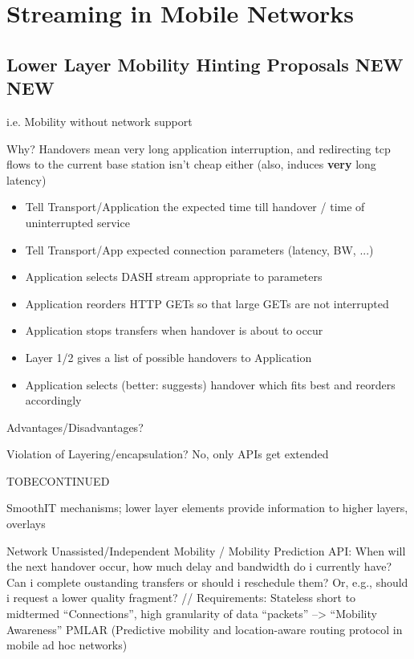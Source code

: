 \chapter{Streaming in Mobile Networks}




\section{Lower Layer Mobility Hinting Proposals NEW NEW}

i.e. Mobility without network support

Why? Handovers mean very long application interruption, and redirecting tcp flows to the current base station isn't cheap either (also, induces \textbf{very} long latency)

\begin{itemize}
\item Tell Transport/Application the expected time till handover / time of uninterrupted service
\item Tell Transport/App expected connection parameters (latency, BW, ...)
\item Application selects DASH stream appropriate to parameters
\item Application reorders HTTP GETs so that large GETs are not interrupted
\item Application stops transfers when handover is about to occur
\item Layer 1/2 gives a list of possible handovers to Application
\item Application selects (better: suggests) handover which fits best and reorders accordingly
\end{itemize}

Advantages/Disadvantages?

Violation of Layering/encapsulation? No, only APIs get extended 

TOBECONTINUED

SmoothIT mechanisms; lower layer elements provide information to higher layers, overlays  \cite{oechsner2009pushing}


Network Unassisted/Independent Mobility / Mobility Prediction API: When will the next handover occur, how much delay and bandwidth do i currently have? Can i complete oustanding transfers or should i reschedule them? Or, e.g., should i request a lower quality fragment? // Requirements: Stateless short to midtermed ``Connections'', high granularity of data ``packets''
--> ``Mobility Awareness'' \cite{hummel2010mobilitaet} PMLAR (Predictive mobility and location-aware routing protocol in mobile ad hoc networks)

